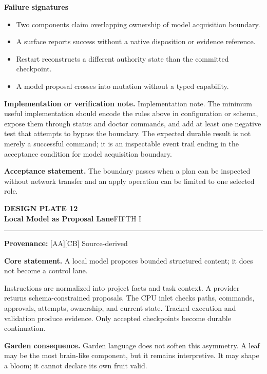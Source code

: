 \documentclass[10pt,letterpaper,oneside]{article}
\newcommand{\prov}[1]{\textcolor{gardenBlue}{\sffamily\footnotesize\textbf{Provenance:} #1}}
\newcommand{\platetitle}[3]{%
  \begin{minipage}[t][0.54in][t]{\textwidth}
  {\sffamily\bfseries\color{gardenDeep}\fontsize{9}{10}\selectfont DESIGN PLATE #1}\\[-1pt]
  {\sffamily\bfseries\color{gardenInk}\fontsize{16.5}{18}\selectfont #2}\hfill{\sffamily\color{gardenGreen}\large #3}
  \end{minipage}\vspace{-2pt}\hrule\vspace{5pt}}
\begin{document}
\textbf{Failure signatures}
\begin{itemize}
\item Two components claim overlapping ownership of model acquisition boundary.
\item A surface reports success without a native disposition or evidence reference.
\item Restart reconstructs a different authority state than the committed checkpoint.
\item A model proposal crosses into mutation without a typed capability.
\end{itemize}
\textbf{Implementation or verification note.} Implementation note. The minimum useful implementation should encode the rules above in configuration or schema, expose them through status and doctor commands, and add at least one negative test that attempts to bypass the boundary. The expected durable result is not merely a successful command; it is an inspectable event trail ending in the acceptance condition for model acquisition boundary.

\begin{acceptbox}
\textbf{Acceptance statement.} The boundary passes when a plan can be inspected without network transfer and an apply operation can be limited to one selected role.
\end{acceptbox}
\newpage
\platetitle{12}{Local Model as Proposal Lane}{FIFTH I}
\prov{[AA][CB] Source-derived}
\fontsize{8.85}{10.45}\selectfont
\begin{corebox}
\textbf{Core statement.} A local model proposes bounded structured content; it does not become a control lane.
\end{corebox}
Instructions are normalized into project facts and task context. A provider returns schema-constrained proposals. The CPU inlet checks paths, commands, approvals, attempts, ownership, and current state. Tracked execution and validation produce evidence. Only accepted checkpoints become durable continuation.

\textbf{Garden consequence.} Garden language does not soften this asymmetry. A leaf may be the most brain-like component, but it remains interpretive. It may shape a bloom; it cannot declare its own fruit valid.
\end{document}
